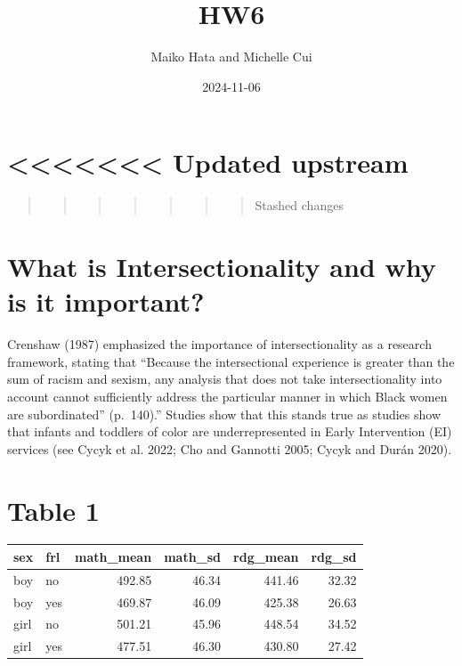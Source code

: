 \documentclass[
  letterpaper,
  DIV=11,
  numbers=noendperiod]{scrartcl}
\title{HW6}
\author{Maiko Hata and Michelle Cui}
\date{2024-11-06}
\begin{document}
\maketitle


\section{\textless\textless\textless\textless\textless\textless\textless{}
Updated upstream}\label{updated-upstream}

\begin{quote}
\begin{quote}
\begin{quote}
\begin{quote}
\begin{quote}
\begin{quote}
\begin{quote}
Stashed changes
\end{quote}
\end{quote}
\end{quote}
\end{quote}
\end{quote}
\end{quote}
\end{quote}

\section{What is Intersectionality and why is it
important?}\label{what-is-intersectionality-and-why-is-it-important}

Crenshaw (1987) emphasized the importance of intersectionality as a
research framework, stating that ``Because the intersectional experience
is greater than the sum of racism and sexism, any analysis that does not
take intersectionality into account cannot sufficiently address the
particular manner in which Black women are subordinated'' (p.~140).''
Studies show that this stands true as studies show that infants and
toddlers of color are underrepresented in Early Intervention (EI)
services (see Cycyk et al. 2022; Cho and Gannotti 2005; Cycyk and Durán
2020).

\section{Table 1}\label{table-1}

\begin{longtable}[]{@{}llrrrr@{}}
\toprule\noalign{}
sex & frl & math\_mean & math\_sd & rdg\_mean & rdg\_sd \\
\midrule\noalign{}
\endhead
\bottomrule\noalign{}
\endlastfoot
boy & no & 492.85 & 46.34 & 441.46 & 32.32 \\
boy & yes & 469.87 & 46.09 & 425.38 & 26.63 \\
girl & no & 501.21 & 45.96 & 448.54 & 34.52 \\
girl & yes & 477.51 & 46.30 & 430.80 & 27.42 \\
\end{longtable}
\end{document}
